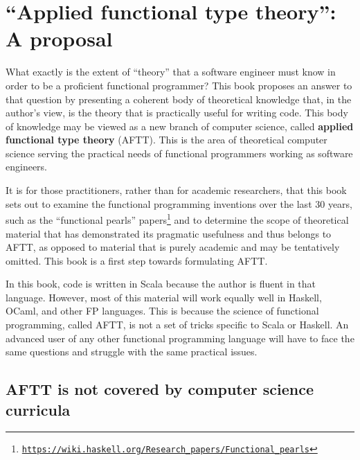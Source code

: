 
\chapter{\textsf{``}Applied functional type theory\textsf{''}: A proposal\label{chap:Applied-functional-type}}

What exactly is the extent of \textsf{``}theory\textsf{''} that a software engineer
must know in order to be a proficient functional programmer? This
book proposes an answer to that question by presenting a coherent
body of theoretical knowledge that, in the author\textsf{'}s view, is the theory
that is practically useful for writing code. This body of knowledge
may be viewed as a new branch of computer science, called \textbf{applied
functional type theory} (AFTT). This is the area of theoretical computer
science serving the practical needs of functional programmers working
as software engineers.

It is for those practitioners, rather than for academic researchers,
that this book sets out to examine the functional programming inventions
over the last 30 years, \textemdash{} such as the \textquotedblleft functional
pearls\textquotedblright{} papers\footnote{\texttt{\href{https://wiki.haskell.org/Research_papers/Functional_pearls}{https://wiki.haskell.org/Research\_papers/Functional\_pearls}}}
\textemdash{} and to determine the scope of theoretical material that
has demonstrated its pragmatic usefulness and thus belongs to AFTT,
as opposed to material that is purely academic and may be tentatively
omitted. This book is a first step towards formulating AFTT.

In this book, code is written in Scala because the author is fluent
in that language. However, most of this material will work equally
well in Haskell, OCaml, and other FP languages. This is because the
science of functional programming, called AFTT, is not a set of tricks
specific to Scala or Haskell. An advanced user of any other functional
programming language will have to face the same questions and struggle
with the same practical issues.

\section{AFTT is not covered by computer science curricula}

